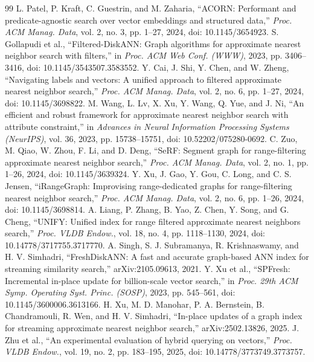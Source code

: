 \documentclass[conference]{IEEEtran}
\begin{document}
\begin{thebibliography}{99}
 L. Patel, P. Kraft, C. Guestrin, and M. Zaharia, ``ACORN: Performant and predicate-agnostic search over vector embeddings and structured data,'' \emph{Proc. ACM Manag. Data}, vol. 2, no. 3, pp. 1--27, 2024, doi: 10.1145/3654923.
 S. Gollapudi et al., ``Filtered-DiskANN: Graph algorithms for approximate nearest neighbor search with filters,'' in \emph{Proc. ACM Web Conf. (WWW)}, 2023, pp. 3406--3416, doi: 10.1145/3543507.3583552.
 Y. Cai, J. Shi, Y. Chen, and W. Zheng, ``Navigating labels and vectors: A unified approach to filtered approximate nearest neighbor search,'' \emph{Proc. ACM Manag. Data}, vol. 2, no. 6, pp. 1--27, 2024, doi: 10.1145/3698822.
 M. Wang, L. Lv, X. Xu, Y. Wang, Q. Yue, and J. Ni, ``An efficient and robust framework for approximate nearest neighbor search with attribute constraint,'' in \emph{Advances in Neural Information Processing Systems (NeurIPS)}, vol. 36, 2023, pp. 15738--15751, doi: 10.52202/075280-0692.
 C. Zuo, M. Qiao, W. Zhou, F. Li, and D. Deng, ``SeRF: Segment graph for range-filtering approximate nearest neighbor search,'' \emph{Proc. ACM Manag. Data}, vol. 2, no. 1, pp. 1--26, 2024, doi: 10.1145/3639324.
 Y. Xu, J. Gao, Y. Gou, C. Long, and C. S. Jensen, ``iRangeGraph: Improvising range-dedicated graphs for range-filtering nearest neighbor search,'' \emph{Proc. ACM Manag. Data}, vol. 2, no. 6, pp. 1--26, 2024, doi: 10.1145/3698814.
 A. Liang, P. Zhang, B. Yao, Z. Chen, Y. Song, and G. Cheng, ``UNIFY: Unified index for range filtered approximate nearest neighbors search,'' \emph{Proc. VLDB Endow.}, vol. 18, no. 4, pp. 1118--1130, 2024, doi: 10.14778/3717755.3717770.
 A. Singh, S. J. Subramanya, R. Krishnaswamy, and H. V. Simhadri, ``FreshDiskANN: A fast and accurate graph-based ANN index for streaming similarity search,'' arXiv:2105.09613, 2021.
 Y. Xu et al., ``SPFresh: Incremental in-place update for billion-scale vector search,'' in \emph{Proc. 29th ACM Symp. Operating Syst. Princ. (SOSP)}, 2023, pp. 545--561, doi: 10.1145/3600006.3613166.
 H. Xu, M. D. Manohar, P. A. Bernstein, B. Chandramouli, R. Wen, and H. V. Simhadri, ``In-place updates of a graph index for streaming approximate nearest neighbor search,'' arXiv:2502.13826, 2025.
 J. Zhu et al., ``An experimental evaluation of hybrid querying on vectors,'' \emph{Proc. VLDB Endow.}, vol. 19, no. 2, pp. 183--195, 2025, doi: 10.14778/3773749.3773757.

\end{thebibliography}
\end{document}
